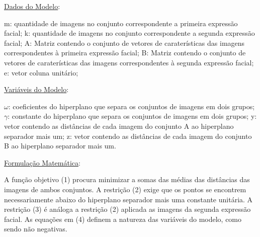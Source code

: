 \underline{Dados do Modelo}:

m: quantidade de imagens no conjunto correspondente a primeira expressão facial;
k: quantidade de imagens no conjunto correspondente a segunda expressão facial;
A: Matriz contendo o conjunto de vetores de caraterísticas das imagens correspondentes à primeira expressão facial;
B: Matriz contendo o conjunto de vetores de caraterísticas das imagens correspondentes à segunda expressão facial;
e:  vetor coluna unitário;

\underline{Variáveis do Modelo}:

$\omega$: coeficientes do hiperplano que separa os conjuntos de imagens em dois grupos;
$\gamma$: constante do hiperplano que separa os conjuntos de imagens em dois grupos;
y: vetor contendo as distâncias de cada imagem do conjunto A ao hiperplano separador mais um;
z: vetor contendo as distâncias de cada imagem do conjunto B ao hiperplano separador mais um.

\underline{Formulação Matemática}:

	A função objetivo (1) procura minimizar a somas das médias das distâncias das imagens de ambos conjuntos. A restrição (2) exige que os pontos se encontrem necessariamente abaixo do hiperplano separador mais uma constante unitária.  A restrição (3) é análoga a restrição (2) aplicada as imagens da segunda expressão facial. As equações em (4) definem a natureza das variáveis do modelo, como sendo não negativas.

